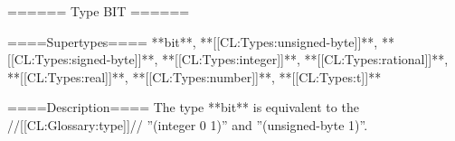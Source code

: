 ====== Type BIT ======

====Supertypes====
**bit**, **[[CL:Types:unsigned-byte]]**, **[[CL:Types:signed-byte]]**, **[[CL:Types:integer]]**, **[[CL:Types:rational]]**, **[[CL:Types:real]]**, **[[CL:Types:number]]**, **[[CL:Types:t]]**

====Description====
The type **bit** is equivalent to the //[[CL:Glossary:type]]// ''(integer 0 1)'' and ''(unsigned-byte 1)''.

